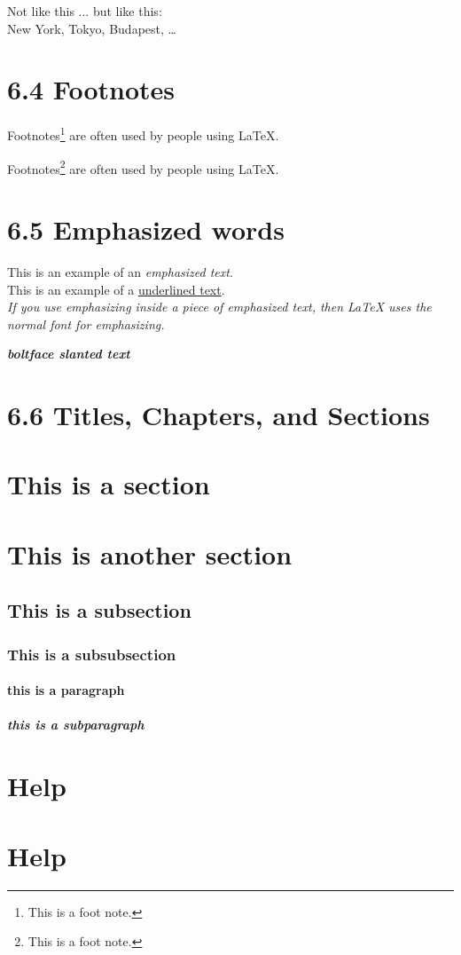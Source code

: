 \documentclass{article}
\begin{document}
Not like this ... but like this:\\
New York, Tokyo, Budapest, \ldots

\section{6.4 Footnotes}


Footnotes\footnote{This is a foot note.} are often used
by people using \LaTeX. %

Footnotes\footnote{This is a foot note.} are often used
by people using \LaTeX. %


\section{6.5 Emphasized words}

This is an example of an \emph{emphasized text}.\\ %
This is an example of a \underline{underlined text}.\\%

\emph{If you use emphasizing inside a piece of emphasized text, then \LaTeX{} uses the \emph{normal} font for emphasizing.} %

\textbf{\textsl{boltface slanted text}} %

\section{6.6 Titles, Chapters, and Sections}

\section{This is a section}
\section*{This is another section}
\subsection{This is a subsection}
\subsubsection{This is a subsubsection}
\paragraph{this is a paragraph}
\subparagraph{this is a subparagraph}

\section{Help} %
\section*{Help} %
\end{document}
